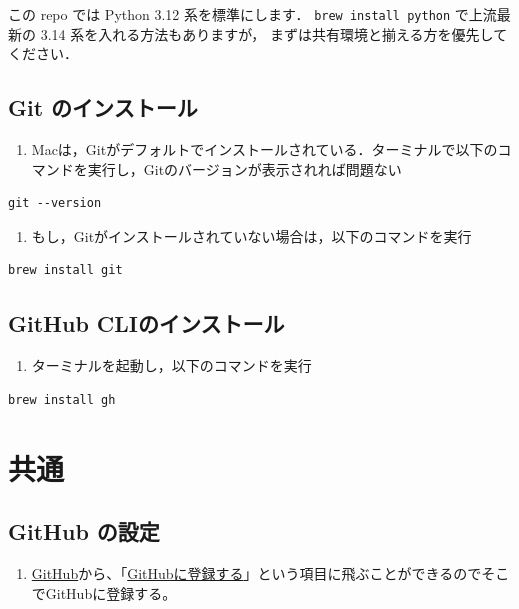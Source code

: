 この repo では Python 3.12 系を標準にします．
\texttt{brew install python} で上流最新の 3.14 系を入れる方法もありますが，
まずは共有環境と揃える方を優先してください．


\section{Git のインストール}

\begin{enumerate}
\item Macは，Gitがデフォルトでインストールされている．ターミナルで以下のコマンドを実行し，Gitのバージョンが表示されれば問題ない
\end{enumerate}

\begin{lstlisting}[style=codecell]
    git --version
\end{lstlisting}

\begin{enumerate}
\item もし，Gitがインストールされていない場合は，以下のコマンドを実行
\end{enumerate}

\begin{lstlisting}[style=codecell]
    brew install git
\end{lstlisting}


\section{GitHub CLIのインストール}

\begin{enumerate}
\item ターミナルを起動し，以下のコマンドを実行
\end{enumerate}


\begin{lstlisting}[style=codecell]
    brew install gh
\end{lstlisting}


\chapter{共通}


\section{GitHub の設定}

\begin{enumerate}
\item \href{https://github.co.jp/}{GitHub}から、「\href{https://github.com/join}{GitHubに登録する}」という項目に飛ぶことができるのでそこでGitHubに登録する。
\end{enumerate}

